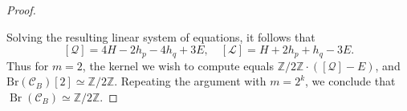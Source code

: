 \documentclass[10pt,a4paper]{amsart}
\DeclareMathOperator{\Br}{Br}
\begin{document}
\begin{proof}
\begin{enumerate}
\end{enumerate}
Solving the resulting linear system of equations, it follows that 
\[
[\mathcal{Q}] = 4 H -2 h_p - 4 h_q +3 E, \quad [\mathcal{L}] = H + 2 h_p + h_q - 3E.
\]
Thus for $m=2$, the kernel we wish to compute equals $\mathbb Z/2\mathbb Z\cdot([\mathcal{Q}]-E)$, and $\mathrm{Br}(\mathcal{C}_B)[2]\simeq \mathbb Z/2\mathbb Z$. Repeating the argument with $m = 2^k$, we conclude that $\Br(\mathcal C_B) \simeq \mathbb Z/2\mathbb Z$.
\end{proof}
\end{document}
